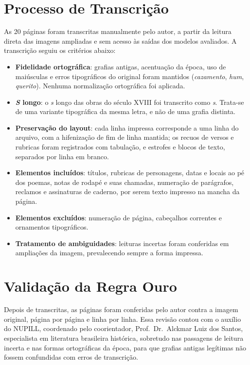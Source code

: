 \documentclass[noabntexcite,oneside]{ufsc-thesis-rn46-2019}
\begin{document}
\section{Processo de Transcrição}
\label{sec:transcricao}

As 20 páginas foram transcritas manualmente pelo autor, a partir da leitura direta das
imagens ampliadas e sem acesso às saídas dos modelos avaliados. A transcrição seguiu os
critérios abaixo:

\begin{itemize}
    \item \textbf{Fidelidade ortográfica}: grafias antigas, acentuação da época, uso de
    maiúsculas e erros tipográficos do original foram mantidos (\textit{cazamento},
    \textit{hum}, \textit{querito}). Nenhuma normalização ortográfica foi aplicada.

    \item \textbf{\textit{S} longo}: o \textit{s} longo das obras do século XVIII foi
    transcrito como \textit{s}. Trata-se de uma variante tipográfica da mesma letra, e não
    de uma grafia distinta.

    \item \textbf{Preservação do layout}: cada linha impressa corresponde a uma linha do
    arquivo, com a hifenização de fim de linha mantida; os recuos de versos e rubricas
    foram registrados com tabulação, e estrofes e blocos de texto, separados por linha em
    branco.

    \item \textbf{Elementos incluídos}: títulos, rubricas de personagens, datas e locais ao
    pé dos poemas, notas de rodapé e suas chamadas, numeração de parágrafos, reclamos e
    assinaturas de caderno, por serem texto impresso na mancha da página.

    \item \textbf{Elementos excluídos}: numeração de página, cabeçalhos correntes e
    ornamentos tipográficos.

    \item \textbf{Tratamento de ambiguidades}: leituras incertas foram conferidas em
    ampliações da imagem, prevalecendo sempre a forma impressa.
\end{itemize}

\section{Validação da Regra Ouro}

Depois de transcritas, as páginas foram conferidas pelo autor contra a imagem original,
página por página e linha por linha. Essa revisão contou com o auxílio do NUPILL,
coordenado pelo coorientador, Prof.\ Dr.\ Alckmar Luiz dos Santos, especialista em
literatura brasileira histórica, sobretudo nas passagens de leitura incerta e nas formas
ortográficas da época, para que grafias antigas legítimas não fossem confundidas com erros
de transcrição.
\end{document}
